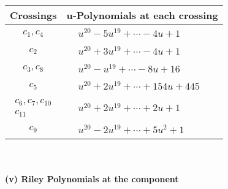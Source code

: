 \documentclass[1p]{elsarticle_modified}
\theoremstyle{definition}
\begin{document}
\begin{tabular}{m{50pt}|m{274pt}}
Crossings & \hspace{64pt}u-Polynomials at each crossing \\
\hline $$\begin{aligned}c_{1},c_{4}\end{aligned}$$&$\begin{aligned}
&u^{20}-5 u^{19}+\cdots-4 u+1
\end{aligned}$\\
\hline $$\begin{aligned}c_{2}\end{aligned}$$&$\begin{aligned}
&u^{20}+3 u^{19}+\cdots-4 u+1
\end{aligned}$\\
\hline $$\begin{aligned}c_{3},c_{8}\end{aligned}$$&$\begin{aligned}
&u^{20}- u^{19}+\cdots-8 u+16
\end{aligned}$\\
\hline $$\begin{aligned}c_{5}\end{aligned}$$&$\begin{aligned}
&u^{20}+2 u^{19}+\cdots+154 u+445
\end{aligned}$\\
\hline $$\begin{aligned}c_{6},c_{7},c_{10}\\c_{11}\end{aligned}$$&$\begin{aligned}
&u^{20}+2 u^{19}+\cdots+2 u+1
\end{aligned}$\\
\hline $$\begin{aligned}c_{9}\end{aligned}$$&$\begin{aligned}
&u^{20}-2 u^{19}+\cdots+5 u^2+1
\end{aligned}$\\
\hline
\end{tabular}\\~\\
\newpage\renewcommand{\arraystretch}{1}
\flushleft \textbf{(v) Riley Polynomials at the component}\newline \\
\end{document}

